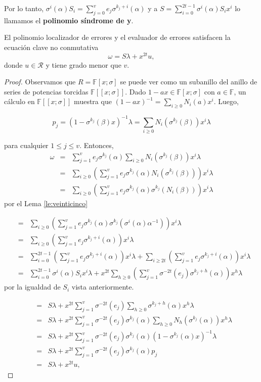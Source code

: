Por lo tanto, $\sigma^i(\alpha)S_i = \sum_{j=0}^{v} e_j\sigma^{k_j+i}(\alpha)$ y a $S = \sum_{i=0}^{2t-1} \sigma^i(\alpha)S_ix^i$ lo llamamos el \textbf{polinomio síndrome de y}.

\begin{theorem}
    El polinomio localizador de errores y el evaluador de errores satisfacen la ecuación clave no conmutativa 
    \[ \omega = S\lambda + x^{2t}u ,\]
donde $u \in \mathcal{R}$ y tiene grado menor que $v$.
\end{theorem}

\begin{proof}
    Observamos que $R = \mathbb{F}[x;\sigma]$ se puede ver como un subanillo del anillo de series de potencias torcidas $\mathbb{F}[[x;\sigma]]$. Dado $1-ax \in \mathbb{F}[x;\sigma]$ con $a \in \mathbb{F}$, un cálculo en $\mathbb{F}[[x;\sigma]]$ muestra que $(1-ax)^{-1} = \sum_{i\geq 0} N_i(a)x^i$. Luego,

    \[ p_j = (1-\sigma^{k_j}(\beta)x)^{-1}\lambda = \sum_{i\geq 0} N_i(\sigma^{k_j}(\beta))x^i\lambda\]

para cualquier $1 \leq j \leq v$. Entonces,
\begin{eqnarray*}
    \omega & = & \sum_{j=1}^v e_j\sigma^{k_j}(\alpha)\sum_{i\geq 0} N_i(\sigma^{k_j}(\beta))x^i\lambda \\
     & = & \sum_{i\geq 0}(\sum_{j=1}^v e_j\sigma^{k_j}(\alpha) N_i(\sigma^{k_j}(\beta)))x^i\lambda \\ 
    & = & \sum_{i\geq 0}(\sum_{j=1}^v e_j\sigma^{k_j}(\alpha) \sigma^{k_j}(N_i(\beta)))x^i\lambda 
\end{eqnarray*}
 por el Lema \ref{le:veinticinco}

\begin{eqnarray*}
   & = & \sum_{i\geq 0}(\sum_{j=1}^v e_j\sigma^{k_j}(\alpha) \sigma^{k_j}(\sigma^i(\alpha)\alpha^{-1}))x^i\lambda \\
  & = &  \sum_{i\geq 0}(\sum_{j=1}^v e_j\sigma^{k_j+i}(\alpha))x^i\lambda \\
  &  = & \sum_{i=0}^{2t-1}(\sum_{j=1}^v e_j\sigma^{k_j+i}(\alpha))x^i\lambda + \sum_{i \geq 2t}(\sum_{j=1}^v e_j\sigma^{k_j+i}(\alpha))x^i\lambda \\
   & = & \sum_{i=0}^{2t-1} \sigma^{i}(\alpha)S_ix^i\lambda + x^{2t}\sum_{h \geq 0}(\sum_{j=1}^v \sigma^{-2t}(e_j)\sigma^{k_j+h}(\alpha))x^h\lambda 
\end{eqnarray*}
 por la igualdad de $S_i$ vista anteriormente.

 \begin{eqnarray*}
     & = & S\lambda + x^{2t}\sum_{j=1}^v \sigma^{-2t}(e_j)\sum_{h \geq 0}\sigma^{k_j+h}(\alpha)x^h\lambda \\
       & = & S\lambda + x^{2t}\sum_{j=1}^v \sigma^{-2t}(e_j)\sigma^{k_j}(\alpha) \sum_{h \geq 0}N_h(\sigma^{k_j}(\alpha))x^h\lambda \\
      & = & S\lambda + x^{2t}\sum_{j=1}^v \sigma^{-2t}(e_j)\sigma^{k_j}(\alpha)(1-\sigma^{k_j}(\alpha)x)^{-1}\lambda \\
       & = & S\lambda + x^{2t}\sum_{j=1}^v \sigma^{-2t}(e_j)\sigma^{k_j}(\alpha)p_j \\
       & = & S\lambda + x^{2t}u , 
 \end{eqnarray*}


\end{proof}
